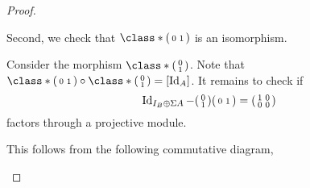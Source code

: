 \begin{proof}
\begin{enumerate}[label={(\bfseries TR\arabic*)}]
{            Second, we check that \( \class*{
                \begin{psmallmatrix}
                    0 & 1
                \end{psmallmatrix}
            } \) is an isomorphism.

            Consider the morphism \( \class*{
                \begin{psmallmatrix}
                    0 \\
                    1
                \end{psmallmatrix}
            } \).
            Note that \( \class*{
                \begin{psmallmatrix}
                    0 & 1
                \end{psmallmatrix}
            } \circ \class*{
                \begin{psmallmatrix}
                    0 \\
                    1
                \end{psmallmatrix}
            } = [\Id_A] \).
            It remains to check if
            \[
                \operatorname{Id}_{I_B \oplus \Sigma A} -
                \begin{psmallmatrix}
                    0 \\
                    1
                \end{psmallmatrix}
                \begin{psmallmatrix}
                    0 & 1
                \end{psmallmatrix}
                =
                \begin{psmallmatrix}
                    1 & 0 \\
                    0 & 0
                \end{psmallmatrix}
            \]
            factors through a projective module.

            This follows from the following commutative diagram,
            \begin{center}
\end{center}}
\end{enumerate}
\end{proof}
